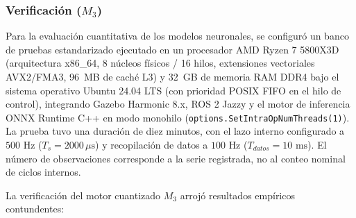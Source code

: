 \documentclass[12pt]{article}
\begin{document}
\subsubsection{Verificación ($M_3$)}
\label{sec:ver_m3}

Para la evaluación cuantitativa de los modelos neuronales, se configuró un banco de pruebas estandarizado ejecutado en un procesador AMD Ryzen 7 5800X3D (arquitectura x86\_64, 8 núcleos físicos / 16 hilos, extensiones vectoriales AVX2/FMA3, 96~MB de caché L3) y 32~GB de memoria RAM DDR4 bajo el sistema operativo Ubuntu 24.04 LTS (con prioridad POSIX FIFO en el hilo de control), integrando Gazebo Harmonic 8.x, ROS 2 Jazzy y el motor de inferencia ONNX Runtime C++ en modo monohilo (\texttt{options.SetIntraOpNumThreads(1)}). La prueba tuvo una duración de diez minutos, con el lazo interno configurado a $500\text{ Hz}$ ($T_s=2000\,\mu\text{s}$) y recopilación de datos a $100\text{ Hz}$ ($T_{datos}=10\text{ ms}$). El número de observaciones corresponde a la serie registrada, no al conteo nominal de ciclos internos.

La verificación del motor cuantizado $M_3$ arrojó resultados empíricos contundentes:
\end{document}

